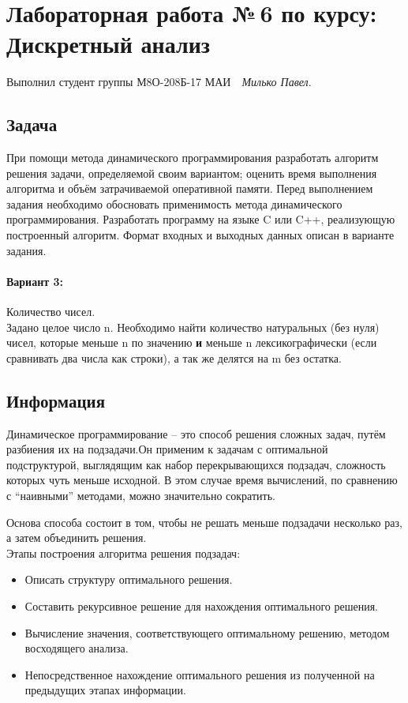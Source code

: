 \documentclass[12pt]{article}
\begin{document}
\section*{\centering Лабораторная работа №\,6 по курсу:\\ Дискретный анализ}

Выполнил студент группы М8О-208Б-17 МАИ \,\, \textit{Милько Павел}.

\subsection*{Задача}

При помощи метода динамического программирования разработать алгоритм решения задачи, определяемой своим вариантом; оценить время выполнения
алгоритма и объём затрачиваемой оперативной памяти. Перед выполнением задания
необходимо обосновать применимость метода динамического программирования.
Разработать программу на языке C или C++, реализующую построенный алгоритм.
Формат входных и выходных данных описан в варианте задания.

\paragraph*{Вариант 3:} Количество чисел.\\

Задано целое число n. Необходимо найти количество натуральных (без нуля) чисел, которые меньше n по
значению {\bf и} меньше n лексикографически (если сравнивать два числа как строки), а так же делятся на m без остатка.


\subsection*{Информация}

Динамическое программирование -- это способ решения сложных задач, путём разбиения их на подзадачи.Он применим к задачам с оптимальной подструктурой, выглядящим как набор перекрывающихся подзадач, сложность которых чуть меньше исходной. В этом случае время вычислений, по сравнению с ``наивными'' методами, можно значительно сократить.

Основа способа состоит в том, чтобы не решать меньше подзадачи несколько раз, а затем объединить решения.\\

\noindent Этапы построения алгоритма решения подзадач:
\begin{itemize}
	\item  Описать структуру оптимального решения.
	\item Составить рекурсивное решение для нахождения оптимального решения.
\item 	Вычисление значения, соответствующего оптимальному решению, методом восходящего анализа.
\item 	Непосредственное нахождение оптимального решения из полученной на предыдущих этапах информации.
	
\end{itemize}
\end{document}
